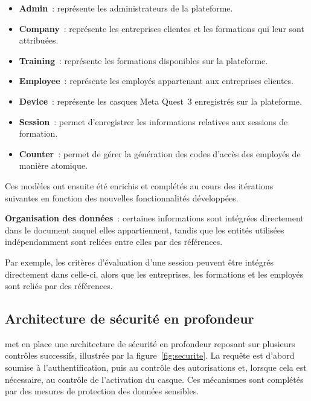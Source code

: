 \begin{itemize}

  \item \textbf{Admin}~: représente les administrateurs de la plateforme.

  \item \textbf{Company}~: représente les entreprises clientes et les formations
    qui leur sont attribuées.

  \item \textbf{Training}~: représente les formations disponibles sur la plateforme.

  \item \textbf{Employee}~: représente les employés appartenant aux entreprises clientes.

  \item \textbf{Device}~: représente les casques Meta Quest~3 enregistrés
    sur la plateforme.

  \item \textbf{Session}~: permet d'enregistrer les informations relatives
    aux sessions de formation.

  \item \textbf{Counter}~: permet de gérer la génération des codes d'accès
    des employés de manière atomique.

\end{itemize}

Ces modèles ont ensuite été enrichis et complétés au cours des itérations suivantes
en fonction des nouvelles fonctionnalités développées.

\begin{notebox}

  \textbf{Organisation des données}~: certaines informations sont intégrées
  directement dans le document auquel elles appartiennent, tandis que les
  entités utilisées indépendamment sont reliées entre elles par des références.

  Par exemple, les critères d'évaluation d'une session peuvent être intégrés
  directement dans celle-ci, alors que les entreprises, les formations et les
  employés sont reliés par des références.

\end{notebox}

\subsection{Architecture de sécurité en profondeur}

\tynassit{} met en place une architecture de sécurité en profondeur reposant sur
plusieurs contrôles successifs, illustrée par la figure~\ref{fig:securite}.
La requête est d'abord soumise à l'authentification, puis au contrôle des
autorisations et, lorsque cela est nécessaire, au contrôle de l'activation du casque.
Ces mécanismes sont complétés par des mesures de protection des données sensibles.

